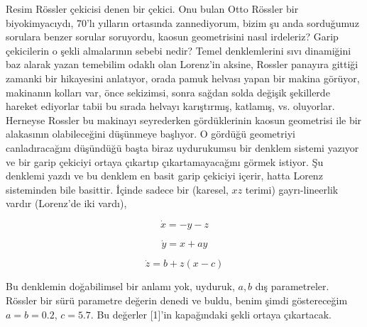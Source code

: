 \documentclass[12pt,fleqn]{article}\usepackage{../../common}
\begin{document}
Resim Rössler çekicisi denen bir çekici. Onu bulan Otto Rössler bir
biyokimyacıydı, 70'lı yılların ortasında zannediyorum, bizim şu anda
sorduğumuz sorulara benzer sorular soruyordu, kaosun geometrisini nasıl
irdeleriz? Garip çekicilerin o şekli almalarının sebebi nedir? Temel
denklemlerini sıvı dinamiğini baz alarak yazan temebilim odaklı olan
Lorenz'in aksine, Rossler panayıra gittiği zamanki bir hikayesini
anlatıyor, orada pamuk helvası yapan bir makina görüyor, makinanın kolları
var, önce sekizimsi, sonra sağdan solda değişik şekillerde hareket
ediyorlar tabii bu sırada helvayı karıştırmış, katlamış,
vs. oluyorlar. Herneyse Rossler bu makinayı seyrederken gördüklerinin
kaosun geometrisi ile bir alakasının olabileceğini düşünmeye başlıyor. O
gördüğü geometriyi canladıracağını düşündüğü başta biraz uydurukumsu bir
denklem sistemi yazıyor ve bir garip çekiciyi ortaya çıkartıp
çıkartamayacağını görmek istiyor. Şu denklemi yazdı ve bu denklem en basit
garip çekiciyi içerir, hatta Lorenz sisteminden bile basittir. İçinde
sadece bir (karesel, $xz$ terimi) gayrı-lineerlik vardır (Lorenz'de iki
vardı),

$$ \dot{x} = -y -z$$

$$ \dot{y} = x + a y$$

$$ \dot{z} = b + z(x-c)$$

Bu denklemin doğabilimsel bir anlamı yok, uyduruk, $a,b$ dış parametreler.
Rössler bir sürü parametre değerin denedi ve buldu, benim şimdi
göstereceğim $a=b=0.2$, $c=5.7$. Bu değerler [1]'in kapağındaki şekli
ortaya çıkartacak. 
\end{document}
